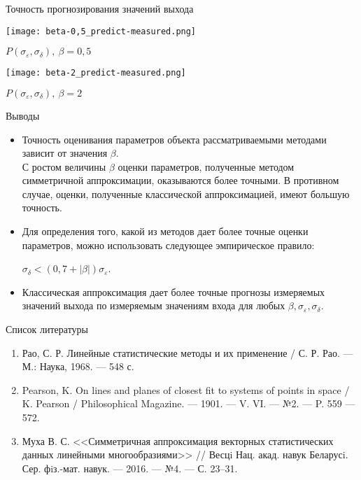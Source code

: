 \documentclass[hyperref={pdftex,unicode}]{beamer}
\begin{document}
\begin{frame}{Точность прогнозирования значений выхода}
  \begin{minipage}[h]{0.49\linewidth}\centering
    \texttt{[image: beta-0,5\_predict-measured.png]}

    \bigskip
    \scriptsize\( P(\sigma_{\varepsilon}, \sigma_{\delta}), \: \beta = 0{,}5 \)
  \end{minipage}
  \hfill
  \begin{minipage}[h]{0.49\linewidth}\centering
    \texttt{[image: beta-2\_predict-measured.png]}

    \bigskip
    \scriptsize\( P(\sigma_{\varepsilon}, \sigma_{\delta}), \: \beta = 2 \)
  \end{minipage}
\end{frame}

\begin{frame}{Выводы}
  \begin{itemize}
  \item Точность оценивания параметров объекта рассматриваемыми
    методами зависит от значения \( \beta \). \\
    С ростом величины \( \beta \) оценки параметров,
    полученные методом симметричной аппроксимации, оказываются более точными.
    В противном случае, оценки, полученные классической аппроксимацией,
    имеют большую точность.
  \item Для определения того, какой из методов дает более точные оценки параметров,
    можно использовать следующее эмпирическое правило:
    \begin{center}
      \( \sigma_{\delta} < (0,7 + |\beta|)\sigma_{\varepsilon} \).
    \end{center}
  \item Классическая аппроксимация дает более точные прогнозы измеряемых
    значений выхода по измеряемым значениям входа для любых
    \( \beta, \sigma_{\varepsilon}, \sigma_{\delta} \).
  \end{itemize}
\end{frame}

\begin{frame}{Список литературы}
  \begin{enumerate}
  \item Рао, С. Р. Линейные статистические методы и их применение /
    С. Р. Рао. --- М.: Наука, 1968. --- 548 с.
  \item Pearson, K. On lines and planes of closest fit to systems of points in space /
    K. Pearson / Philosophical Magazine. --- 1901. --- V. VI. --- №2. --- P. 559 --- 572.
  \item Муха В. С.
    <<Симметричная аппроксимация векторных статистических данных линейными многообразиями>> //
    Весцi Нац. акад. навук Беларусi. Сер. фiз.-мат. навук. --- 2016. --- №4. --- С. 23--31.
  \end{enumerate}
\end{frame}
\end{document}
